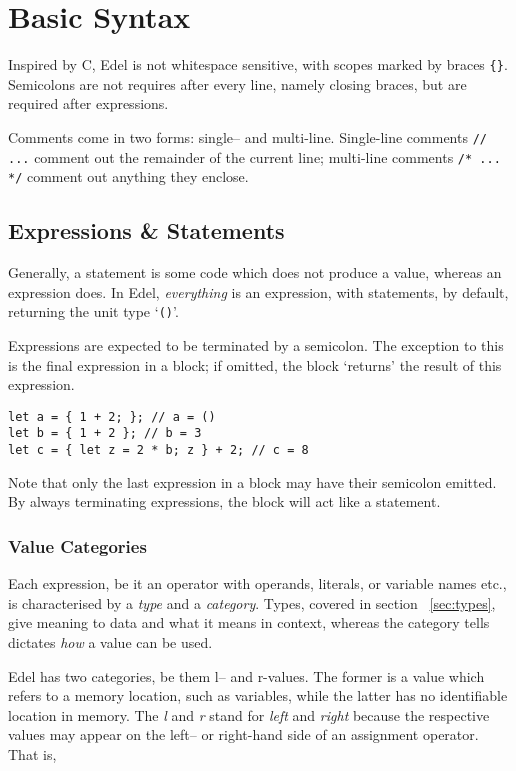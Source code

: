 \section{Basic Syntax}\label{sec:basic-syntax}

Inspired by C, Edel is not whitespace sensitive, with scopes marked by braces \texttt{\{\}}.
Semicolons are not requires after every line, namely closing braces, but are required after expressions.

Comments come in two forms: single-- and multi-line.
Single-line comments \texttt{// ...} comment out the remainder of the current line;
multi-line comments \texttt{/* ... */} comment out anything they enclose.

\subsection{Expressions \& Statements}\label{subsec:expressions-&-statements}

Generally, a statement is some code which does not produce a value, whereas an expression does.
In Edel, \textit{everything} is an expression, with statements, by default, returning the unit type `\texttt{()}'.

Expressions are expected to be terminated by a semicolon.
The exception to this is the final expression in a block; if omitted, the block `returns' the result of this expression.

\begin{lstlisting}[language=CustomLang]
let a = { 1 + 2; }; // a = ()
let b = { 1 + 2 }; // b = 3
let c = { let z = 2 * b; z } + 2; // c = 8
\end{lstlisting}

Note that only the last expression in a block may have their semicolon emitted.
By always terminating expressions, the block will act like a statement.

\subsubsection{Value Categories}

Each expression, be it an operator with operands, literals, or variable names etc., is characterised by a \textit{type} and a \textit{category}.
Types, covered in section ~\ref{sec:types}, give meaning to data and what it means in context, whereas the category tells dictates \textit{how} a value can be used.

Edel has two categories, be them l-- and r-values.
The former is a value which refers to a memory location, such as variables, while the latter has no identifiable location in memory.
The \textit{l} and \textit{r} stand for \textit{left} and \textit{right} because the respective values may appear on the left-- or right-hand side of an assignment operator.
That is,

